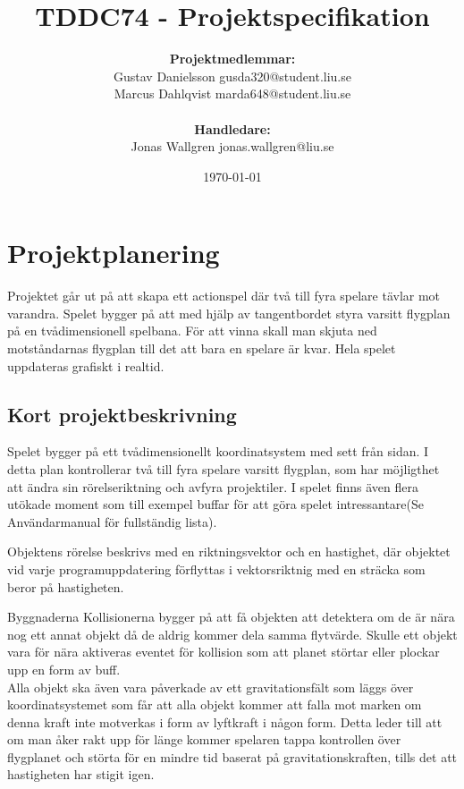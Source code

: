 \documentclass[12pt,a4paper]{article}
\title{TDDC74 -  Projektspecifikation}
\author{\textbf{Projektmedlemmar:}\\
Gustav Danielsson \small{gusda320@student.liu.se}\\
Marcus Dahlqvist \small{marda648@student.liu.se}\\ 
\bigskip\\ \textbf{Handledare:}\\
Jonas Wallgren {\small jonas.wallgren@liu.se}}
\date{\today}
\begin{document}
\maketitle
\newpage

\tableofcontents
\newpage

\section{Projektplanering}
Projektet går ut på att skapa ett actionspel där två till fyra spelare tävlar mot varandra. Spelet bygger på att med hjälp av tangentbordet styra varsitt flygplan på en tvådimensionell spelbana. För att vinna skall man skjuta ned motståndarnas flygplan till det att bara en spelare är kvar. Hela spelet uppdateras grafiskt i realtid.

\subsection{Kort projektbeskrivning}
Spelet bygger på ett tvådimensionellt koordinatsystem med sett från sidan. I detta plan kontrollerar två till fyra spelare varsitt flygplan, som har möjligthet att ändra sin rörelseriktning och avfyra projektiler. I spelet finns även flera utökade moment som till exempel buffar för att göra spelet intressantare(Se Användarmanual  för fullständig lista). 

\vspace{0.2cm}

Objektens rörelse beskrivs med en riktningsvektor och en hastighet, där objektet vid varje programuppdatering förflyttas i vektorsriktnig med en sträcka som beror på hastigheten.

\vspace{0.2cm}

Byggnaderna Kollisionerna bygger på att få objekten att detektera om de är nära nog ett annat objekt då de aldrig kommer dela samma flytvärde. Skulle ett objekt vara för nära aktiveras eventet för kollision som att planet störtar eller plockar upp en form av buff. \\

Alla objekt ska även vara påverkade av ett gravitationsfält som läggs över koordinatsystemet som får att alla objekt kommer att falla mot marken om denna kraft inte motverkas i form av lyftkraft i någon form. Detta leder till att om man åker rakt upp för länge kommer spelaren tappa kontrollen över flygplanet och störta för en mindre tid baserat på gravitationskraften, tills det att hastigheten har stigit igen. \\
\end{document}
